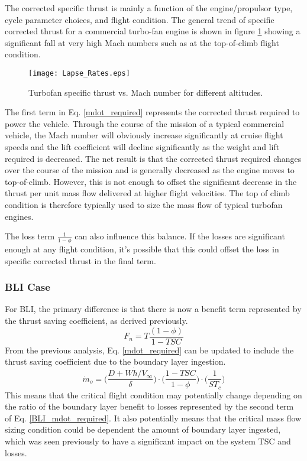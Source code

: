 			The corrected specific thrust is mainly a function of the engine/propulsor type, cycle parameter choices, and flight condition.  The general trend of specific corrected thrust for a commercial turbo-fan engine is shown in figure \ref{Lapse_Rates} showing a significant fall at very high Mach numbers such as at the top-of-climb flight condition.
			\begin{figure}[htp]
				\centering
				\texttt{[image: Lapse\_Rates.eps]}
				\caption{Turbofan specific thrust vs. Mach number for different altitudes.}
				\label{Lapse_Rates}
			\end{figure}			
			The first term in Eq. \ref{mdot_required} represents the corrected thrust required to power the vehicle.  
			Through the course of the mission of a typical commercial vehicle, the Mach number will obviously increase significantly at cruise flight speeds and the lift coefficient will decline significantly as the weight and lift required is decreased.  The net result is that the corrected thrust required changes over the course of the mission and is generally decreased as the engine moves to top-of-climb.  However, this is not enough to offset the significant decrease in the thrust per unit mass flow delivered at higher flight velocities.  The top of climb condition is therefore typically used to size the mass flow of typical turbofan engines.  
			
			The loss term $\frac{1}{1-\phi}$ can also influence this balance.  If the losses are significant enough at any flight condition, it's possible that this could offset the loss in specific corrected thrust in the final term.  
			
		\subsubsection{BLI Case}
			For BLI, the primary difference is that there is now a benefit term represented by the thrust saving coefficient, as derived previously.  
			\begin{equation}
				F_n = T \frac{(1-\phi)}{1-TSC}
			\end{equation}
			From the previous analysis, Eq. \ref{mdot_required} can be updated to include the thrust saving coefficient due to the boundary layer ingestion.
			\begin{equation}
				\dot{m}_o = 
				\Big(\frac{D + W\dot{h}/V_\infty}{\delta}\Big)
				\cdot \Big(\frac{1-TSC}{1-\phi}\Big) \cdot \Big(\frac{1}{ST_c}\Big)
				\label{BLI_mdot_required}
			\end{equation}										
			This means that the critical flight condition may potentially change depending on the ratio of the boundary layer benefit to losses represented by the second term of Eq. \ref{BLI_mdot_required}.  It also potentially means that the critical mass flow sizing condition could be dependent the amount of boundary layer ingested, which was seen previously to have a significant impact on the system TSC and losses.  
			
